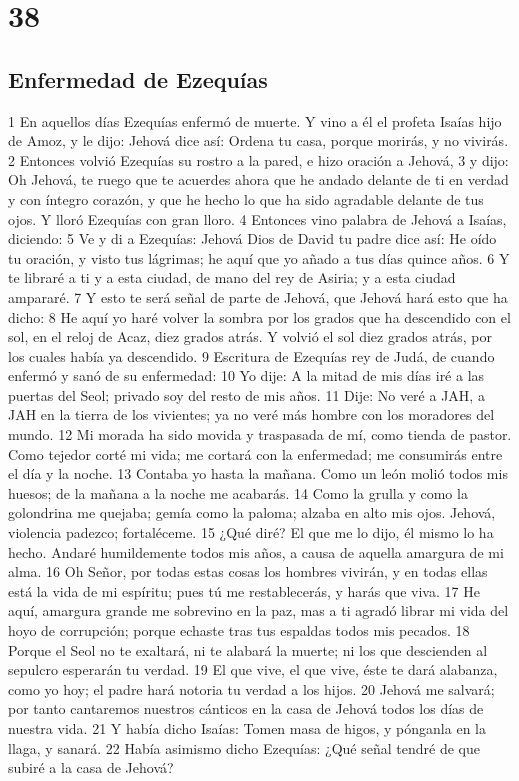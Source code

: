 \chapter{38}

\section*{Enfermedad de Ezequías}

1 En aquellos días Ezequías enfermó de muerte. Y vino a él el profeta Isaías hijo de Amoz, y le dijo: Jehová dice así: Ordena tu casa, porque morirás, y no vivirás.
2 Entonces volvió Ezequías su rostro a la pared, e hizo oración a Jehová,
3 y dijo: Oh Jehová, te ruego que te acuerdes ahora que he andado delante de ti en verdad y con íntegro corazón, y que he hecho lo que ha sido agradable delante de tus ojos. Y lloró Ezequías con gran lloro.
4 Entonces vino palabra de Jehová a Isaías, diciendo:
5 Ve y di a Ezequías: Jehová Dios de David tu padre dice así: He oído tu oración, y visto tus lágrimas; he aquí que yo añado a tus días quince años.
6 Y te libraré a ti y a esta ciudad, de mano del rey de Asiria; y a esta ciudad ampararé.
7 Y esto te será señal de parte de Jehová, que Jehová hará esto que ha dicho:
8 He aquí yo haré volver la sombra por los grados que ha descendido con el sol, en el reloj de Acaz, diez grados atrás. Y volvió el sol diez grados atrás, por los cuales había ya descendido.
9 Escritura de Ezequías rey de Judá, de cuando enfermó y sanó de su enfermedad:
10 Yo dije: A la mitad de mis días iré a las puertas del Seol; privado soy del resto de mis años.
11 Dije: No veré a JAH, a JAH en la tierra de los vivientes; ya no veré más hombre con los moradores del mundo.
12 Mi morada ha sido movida y traspasada de mí, como tienda de pastor. Como tejedor corté mi vida; me cortará con la enfermedad; me consumirás entre el día y la noche.
13 Contaba yo hasta la mañana. Como un león molió todos mis huesos; de la mañana a la noche me acabarás.
14 Como la grulla y como la golondrina me quejaba; gemía como la paloma; alzaba en alto mis ojos. Jehová, violencia padezco; fortaléceme.
15 ¿Qué diré? El que me lo dijo, él mismo lo ha hecho. Andaré humildemente todos mis años, a causa de aquella amargura de mi alma.
16 Oh Señor, por todas estas cosas los hombres vivirán, y en todas ellas está la vida de mi espíritu; pues tú me restablecerás, y harás que viva.
17 He aquí, amargura grande me sobrevino en la paz, mas a ti agradó librar mi vida del hoyo de corrupción; porque echaste tras tus espaldas todos mis pecados.
18 Porque el Seol no te exaltará, ni te alabará la muerte; ni los que descienden al sepulcro esperarán tu verdad.
19 El que vive, el que vive, éste te dará alabanza, como yo hoy; el padre hará notoria tu verdad a los hijos.
20 Jehová me salvará; por tanto cantaremos nuestros cánticos en la casa de Jehová todos los días de nuestra vida.
21 Y había dicho Isaías: Tomen masa de higos, y pónganla en la llaga, y sanará.
22 Había asimismo dicho Ezequías: ¿Qué señal tendré de que subiré a la casa de Jehová?

